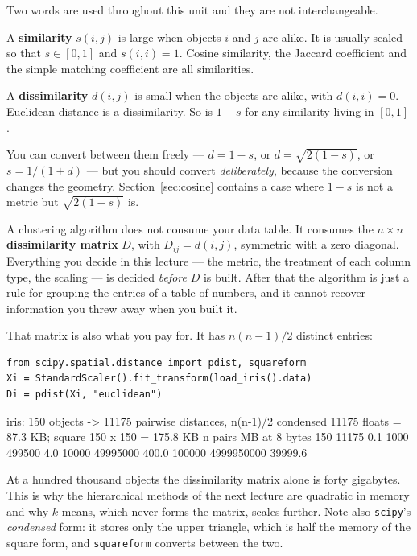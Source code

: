 \documentclass[11pt]{article}
\begin{document}
Two words are used throughout this unit and they are not interchangeable.

A \textbf{similarity} $s(i,j)$ is large when objects $i$ and $j$ are alike.
It is usually scaled so that $s \in [0,1]$ and $s(i,i) = 1$. Cosine
similarity, the Jaccard coefficient and the simple matching coefficient are
all similarities.

A \textbf{dissimilarity} $d(i,j)$ is small when the objects are alike, with
$d(i,i) = 0$. Euclidean distance is a dissimilarity. So is $1 - s$ for any
similarity living in $[0,1]$.

You can convert between them freely --- $d = 1-s$, or $d = \sqrt{2(1-s)}$, or
$s = 1/(1+d)$ --- but you should convert \emph{deliberately}, because the
conversion changes the geometry. Section~\ref{sec:cosine} contains a case
where $1-s$ is not a metric but $\sqrt{2(1-s)}$ is.

\begin{keyidea}
A clustering algorithm does not consume your data table. It consumes the
$n \times n$ \textbf{dissimilarity matrix} $D$, with $D_{ij} = d(i,j)$,
symmetric with a zero diagonal. Everything you decide in this lecture --- the
metric, the treatment of each column type, the scaling --- is decided
\emph{before} $D$ is built. After that the algorithm is just a rule for
grouping the entries of a table of numbers, and it cannot recover information
you threw away when you built it.
\end{keyidea}

That matrix is also what you pay for. It has $n(n-1)/2$ distinct entries:

\begin{lstlisting}
from scipy.spatial.distance import pdist, squareform
Xi = StandardScaler().fit_transform(load_iris().data)
Di = pdist(Xi, "euclidean")
\end{lstlisting}
\begin{codeout}
iris: 150 objects -> 11175 pairwise distances, n(n-1)/2
condensed 11175 floats = 87.3 KB;  square 150 x 150 = 175.8 KB
         n              pairs  MB at 8 bytes
       150              11175            0.1
      1000             499500            4.0
     10000           49995000          400.0
    100000         4999950000        39999.6
\end{codeout}

At a hundred thousand objects the dissimilarity matrix alone is forty
gigabytes. This is why the hierarchical methods of the next lecture are
quadratic in memory and why $k$-means, which never forms the matrix, scales
further. Note also \texttt{scipy}'s \emph{condensed} form: it stores only the
upper triangle, which is half the memory of the square form, and
\texttt{squareform} converts between the two.
\end{document}
